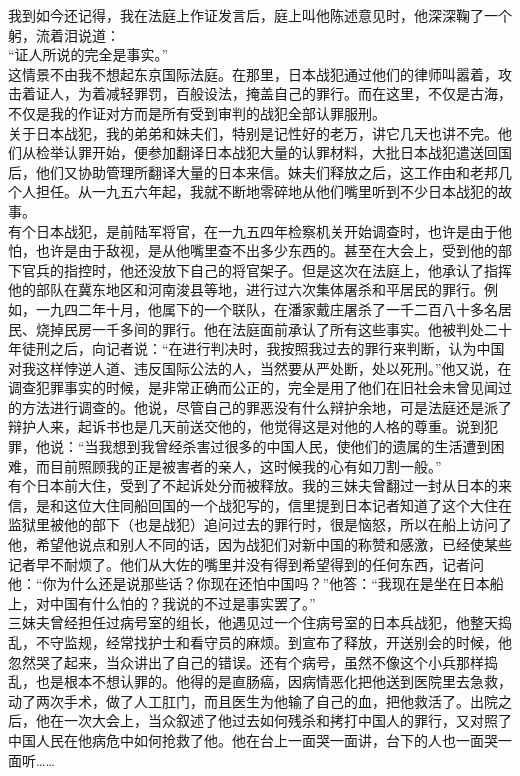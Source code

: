 我到如今还记得，我在法庭上作证发言后，庭上叫他陈述意见时，他深深鞠了一个躬，流着泪说道：\\

“证人所说的完全是事实。”\\

这情景不由我不想起东京国际法庭。在那里，日本战犯通过他们的律师叫嚣着，攻击着证人，为着减轻罪罚，百般设法，掩盖自己的罪行。而在这里，不仅是古海，不仅是我的作证对方而是所有受到审判的战犯全部认罪服刑。\\

关于日本战犯，我的弟弟和妹夫们，特别是记性好的老万，讲它几天也讲不完。他们从检举认罪开始，便参加翻译日本战犯大量的认罪材料，大批日本战犯遣送回国后，他们又协助管理所翻译大量的日本来信。妹夫们释放之后，这工作由和老邦几个人担任。从一九五六年起，我就不断地零碎地从他们嘴里听到不少日本战犯的故事。\\

有个日本战犯，是前陆军将官，在一九五四年检察机关开始调查时，也许是由于他怕，也许是由于敌视，是从他嘴里查不出多少东西的。甚至在大会上，受到他的部下官兵的指控时，他还没放下自己的将官架子。但是这次在法庭上，他承认了指挥他的部队在冀东地区和河南浚县等地，进行过六次集体屠杀和平居民的罪行。例如，一九四二年十月，他属下的一个联队，在潘家戴庄屠杀了一千二百八十多名居民、烧掉民房一千多间的罪行。他在法庭面前承认了所有这些事实。他被判处二十年徒刑之后，向记者说：“在进行判决时，我按照我过去的罪行来判断，认为中国对我这样悖逆人道、违反国际公法的人，当然要从严处断，处以死刑。”他又说，在调查犯罪事实的时候，是非常正确而公正的，完全是用了他们在旧社会未曾见闻过的方法进行调查的。他说，尽管自己的罪恶没有什么辩护余地，可是法庭还是派了辩护人来，起诉书也是几天前送交他的，他觉得这是对他的人格的尊重。说到犯罪，他说：“当我想到我曾经杀害过很多的中国人民，使他们的遗属的生活遭到困难，而目前照顾我的正是被害者的亲人，这时候我的心有如刀割一般。”\\

有个日本前大住，受到了不起诉处分而被释放。我的三妹夫曾翻过一封从日本的来信，是和这位大住同船回国的一个战犯写的，信里提到日本记者知道了这个大住在监狱里被他的部下（也是战犯）追问过去的罪行时，很是恼怒，所以在船上访问了他，希望他说点和别人不同的话，因为战犯们对新中国的称赞和感激，已经使某些记者早不耐烦了。他们从大佐的嘴里并没有得到希望得到的任何东西，记者问他：“你为什么还是说那些话？你现在还怕中国吗？”他答：“我现在是坐在日本船上，对中国有什么怕的？我说的不过是事实罢了。”\\

三妹夫曾经担任过病号室的组长，他遇见过一个住病号室的日本兵战犯，他整天捣乱，不守监规，经常找护士和看守员的麻烦。到宣布了释放，开送别会的时候，他忽然哭了起来，当众讲出了自己的错误。还有个病号，虽然不像这个小兵那样捣乱，也是根本不想认罪的。他得的是直肠癌，因病情恶化把他送到医院里去急救，动了两次手术，做了人工肛门，而且医生为他输了自己的血，把他救活了。出院之后，他在一次大会上，当众叙述了他过去如何残杀和拷打中国人的罪行，又对照了中国人民在他病危中如何抢救了他。他在台上一面哭一面讲，台下的人也一面哭一面听……\\

